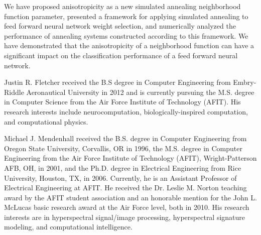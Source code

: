 \documentclass[10pt,journal,cspaper,compsoc]{IEEEtran}
\begin{document}
We have proposed anisotropicity as a new simulated annealing neighborhood function parameter, presented a framework for applying simulated annealing to feed forward neural network weight selection, and numerically analyzed the performance of annealing systems constructed according to this framework. We have demonstrated that the anisotropicity of a neighborhood function can have a significant impact on the classification performance of a feed forward neural network.  

\label{scn:conclusion}






\begin{IEEEbiography} {Justin R. Fletcher} %
received the B.S degree in Computer Engineering from Embry-Riddle Aeronautical University in 2012 and is currently pursuing the M.S. degree in Computer Science from the Air Force Institute of Technology (AFIT). His research interests include neurocomputation, biologically-inspired computation, and computational physics.
\end{IEEEbiography}


\begin{IEEEbiography}{Michael J. Mendenhall} %
	received the B.S. degree in Computer Engineering from Oregon State University, Corvallis, OR in 1996, the M.S. degree in Computer Engineering 
	from the Air Force Institute of Technology (AFIT), Wright-Patterson AFB, OH, in 2001, and the Ph.D. degree in Electrical Engineering from Rice 
	University, Houston, TX, in 2006. Currently, he is an Assistant Professor of Electrical Engineering at AFIT. He received the Dr. Leslie M. Norton 
	teaching award by the AFIT student association and an honorable mention for the John L. McLucas basic research award at the Air Force level, 
	both in 2010.  His research interests are in hyperspectral signal/image processing, hyperspectral signature modeling, and computational intelligence.  
\end{IEEEbiography}
\end{document}
